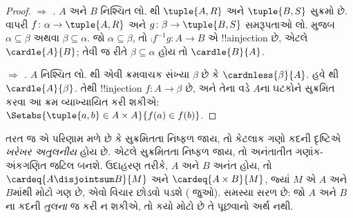 \documentclass[../../../include/open-logic-section]{subfiles}
\begin{document}
\begin{proof}
\emph{ $\Rightarrow$ .}
$A$ અને $B$ નિશ્ચિત લો. થી
$\tuple{A, R}$ અને $\tuple{B, S}$ સુક્રમો છે.
વાપરી $f \colon \alpha \to \tuple{A, R}$
અને $g \colon \beta \to \tuple{B, S}$
સમરૂપતાઓ લો.
મુજબ $\alpha \subseteq \beta$ અથવા
$\beta \subseteq \alpha$. જો
$\alpha \subseteq \beta$, તો
$\comp{f^{-1}}{g} \colon A \to B$
એ !!a{injection} છે, એટલે
$\cardle{A}{B}$; તેવી જ રીતે
$\beta \subseteq \alpha$ હોય તો
$\cardle{B}{A}$.

\emph{ $\Rightarrow$ .}
$A$ નિશ્ચિત લો. થી
એવી ક્રમવાચક સંખ્યા $\beta$ છે કે
$\cardnless{\beta}{A}$. હવે
થી
$\cardle{A}{\beta}$. તેથી !!{injection}
$f \colon A \to \beta$ છે, અને તેના વડે
$A$ના ઘટકોને સુક્રમિત કરવા આ ક્રમ
વ્યાખ્યાયિત કરી શકીએ:
$\Setabs{\tuple{a, b} \in A \times A}{f(a)
\in f(b)}$.
\end{proof}
\noindent
તરત જ એ પરિણામ મળે છે કે સુક્રમિતતા
નિષ્ફળ જાય, તો કેટલાક ગણો કદની દૃષ્ટિએ
\emph{ખરેખર અતુલનીય} હોય છે. એટલે
સુક્રમિતતા નિષ્ફળ જાય, તો અનંતાતીત
ગણાંક-અંકગણિત જટિલ બનશે. ઉદાહરણ તરીકે,
$A$ અને $B$ અનંત હોય, તો
$\cardeq{A \disjointsum B}{M}$ અને
$\cardeq{A \times B}{M}$, જ્યાં
$M$ એ $A$ અને $B$માંથી મોટો ગણ છે,
એવો વિચાર છોડવો પડશે
( જુઓ).
સમસ્યા સરળ છે: જો $A$ અને $B$ના કદની
\emph{તુલના} જ કરી ન શકીએ, તો કયો મોટો
છે તે પૂછવાનો અર્થ નથી.
\end{document}
